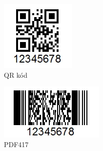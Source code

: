 \begin{figure}[h]\centering
    \centering
    \begin{subfigure}{0.3\textwidth}
    \includegraphics[width=0.9\linewidth]{obrazky-figures/QRcode.png}\hfill
    \caption{QR kód}
    \end{subfigure}
    \begin{subfigure}{0.3\textwidth}
    \includegraphics[width=0.9\linewidth]{obrazky-figures/PDF417.png}\hfill
    \caption{PDF417}
    \end{subfigure}
    \begin{subfigure}{0.3\textwidth}

\end{subfigure}
\end{figure}

